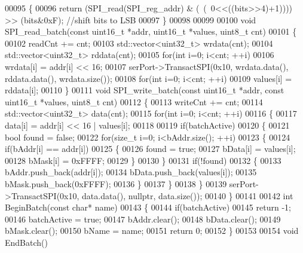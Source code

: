 \begin{DoxyCode}
00095 \{
00096     \textcolor{keywordflow}{return} (SPI_read(SPI\_reg\_addr) & (~(~0<<((bits>>4)+1)))) >> (bits&0xF); \textcolor{comment}{//shift bits to LSB}
00097 \}
00098 
00099 
00100 \textcolor{keywordtype}{void} SPI_read_batch(\textcolor{keyword}{const} uint16\_t *addr, uint16\_t *values, uint8\_t cnt)
00101 \{
00102     readCnt += cnt;
00103     std::vector<uint32\_t> wrdata(cnt);
00104     std::vector<uint32\_t> rddata(cnt);
00105     \textcolor{keywordflow}{for}(\textcolor{keywordtype}{int} i=0; i<cnt; ++i)
00106         wrdata[i] = addr[i] << 16;
00107     serPort->TransactSPI(0x10, wrdata.data(), rddata.data(), wrdata.size());
00108     \textcolor{keywordflow}{for}(\textcolor{keywordtype}{int} i=0; i<cnt; ++i)
00109         values[i] = rddata[i];
00110 \}
00111 \textcolor{keywordtype}{void} SPI_write_batch(\textcolor{keyword}{const} uint16\_t *addr, \textcolor{keyword}{const} uint16\_t *values, uint8\_t cnt)
00112 \{
00113     writeCnt += cnt;
00114     std::vector<uint32\_t> data(cnt);
00115     \textcolor{keywordflow}{for}(\textcolor{keywordtype}{int} i=0; i<cnt; ++i)
00116     \{
00117         data[i] = addr[i] << 16 | values[i];
00118 
00119         \textcolor{keywordflow}{if}(batchActive)
00120         \{
00121             \textcolor{keywordtype}{bool} found = \textcolor{keyword}{false};
00122             \textcolor{keywordflow}{for}(\textcolor{keywordtype}{size\_t} i=0; i<bAddr.size(); ++i)
00123             \{
00124                 \textcolor{keywordflow}{if}(bAddr[i] == addr[i])
00125                 \{
00126                     found = \textcolor{keyword}{true};
00127                     bData[i] = values[i];
00128                     bMask[i] = 0xFFFF;
00129                 \}
00130             \}
00131             \textcolor{keywordflow}{if}(!found)
00132             \{
00133                 bAddr.push\_back(addr[i]);
00134                 bData.push\_back(values[i]);
00135                 bMask.push\_back(0xFFFF);
00136             \}
00137         \}
00138     \}
00139     serPort->TransactSPI(0x10, data.data(), \textcolor{keyword}{nullptr}, data.size());
00140 \}
00141 
00142 \textcolor{keywordtype}{int} BeginBatch(\textcolor{keyword}{const} \textcolor{keywordtype}{char}* name)
00143 \{
00144     \textcolor{keywordflow}{if}(batchActive)
00145         \textcolor{keywordflow}{return} -1;
00146     batchActive = \textcolor{keyword}{true};
00147     bAddr.clear();
00148     bData.clear();
00149     bMask.clear();
00150     bName = name;
00151     \textcolor{keywordflow}{return} 0;
00152 \}
00153 
00154 \textcolor{keywordtype}{void} EndBatch()

\end{DoxyCode}
